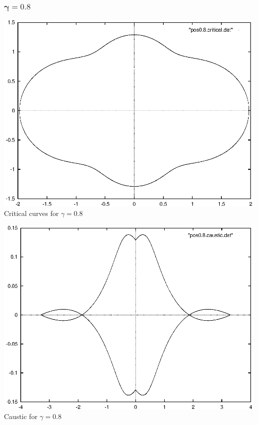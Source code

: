 \documentclass[a4paper]{IEEEtran}
\begin{document}
    \subsubsection{$\mathbf{\gamma = 0.8}$}
    \begin{center}
        \includegraphics[width=\columnwidth]{images/pos0-8-critical.eps} 
        \\[1mm]
        Critical curves for $\gamma = 0.8$
    \end{center}
    \begin{center}
        \includegraphics[width=\columnwidth]{images/pos0-8-caustic.eps} 
        \\[1mm]
        Caustic for $\gamma = 0.8$
    \end{center}
\end{document}
